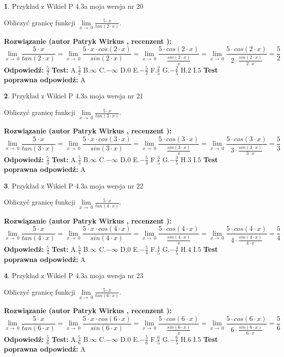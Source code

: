 \documentclass[12pt, a4paper]{article}
\theoremstyle{definition} %
\newtheorem{zad}{}
\newcommand{\zadStart}[1]{\begin{zad}#1\newline}
\newcommand{\zadStop}{\end{zad}}
\newcommand{\rozwStart}[2]{\noindent \textbf{Rozwiązanie (autor #1 , recenzent #2): }\newline}
\newcommand{\rozwStop}{\newline}
\newcommand{\odpStart}{\noindent \textbf{Odpowiedź:}\newline}
\newcommand{\odpStop}{\newline}
\newcommand{\testStart}{\noindent \textbf{Test:}\newline}
\newcommand{\testStop}{\newline}
\newcommand{\kluczStart}{\noindent \textbf{Test poprawna odpowiedź:}\newline}
\newcommand{\kluczStop}{\newline}
\begin{document}
\zadStart{Przykład z Wikieł P 4.3a moja wersja nr 20}


Obliczyć granicę funkcji $\lim\limits_{x\to\ 0}\frac{5 \cdot x}{tan(2 \cdot x)}$.
\zadStop
\rozwStart{Patryk Wirkus}{}
$$\lim\limits_{x\to\ 0}\frac{5 \cdot x}{tan(2 \cdot x)}=\lim\limits_{x\to\ 0}\frac{5 \cdot x \cdot cos(2 \cdot x)}{sin(2 \cdot x)}=\lim\limits_{x\to\ 0}\frac{5 \cdot cos(2 \cdot x)}{\frac{sin(2 \cdot x)}{x}}=\lim\limits_{x\to\ 0}\frac{5 \cdot cos(2 \cdot x)}{2 \cdot \frac{sin(2 \cdot x)}{2 \cdot x}} = \frac{5}{2}$$
\rozwStop
\odpStart
$\frac{5}{2}$
\odpStop
\testStart
A.$\frac{5}{2}$
B.$\infty$
C.$-\infty$
D.$0$
E.$-\frac{5}{2}$
F.$\frac{2}{5}$
G.$-\frac{2}{5}$
H.$2$
I.$5$
\testStop
\kluczStart
A
\kluczStop



\zadStart{Przykład z Wikieł P 4.3a moja wersja nr 21}


Obliczyć granicę funkcji $\lim\limits_{x\to\ 0}\frac{5 \cdot x}{tan(3 \cdot x)}$.
\zadStop
\rozwStart{Patryk Wirkus}{}
$$\lim\limits_{x\to\ 0}\frac{5 \cdot x}{tan(3 \cdot x)}=\lim\limits_{x\to\ 0}\frac{5 \cdot x \cdot cos(3 \cdot x)}{sin(3 \cdot x)}=\lim\limits_{x\to\ 0}\frac{5 \cdot cos(3 \cdot x)}{\frac{sin(3 \cdot x)}{x}}=\lim\limits_{x\to\ 0}\frac{5 \cdot cos(3 \cdot x)}{3 \cdot \frac{sin(3 \cdot x)}{3 \cdot x}} = \frac{5}{3}$$
\rozwStop
\odpStart
$\frac{5}{3}$
\odpStop
\testStart
A.$\frac{5}{3}$
B.$\infty$
C.$-\infty$
D.$0$
E.$-\frac{5}{3}$
F.$\frac{3}{5}$
G.$-\frac{3}{5}$
H.$3$
I.$5$
\testStop
\kluczStart
A
\kluczStop



\zadStart{Przykład z Wikieł P 4.3a moja wersja nr 22}


Obliczyć granicę funkcji $\lim\limits_{x\to\ 0}\frac{5 \cdot x}{tan(4 \cdot x)}$.
\zadStop
\rozwStart{Patryk Wirkus}{}
$$\lim\limits_{x\to\ 0}\frac{5 \cdot x}{tan(4 \cdot x)}=\lim\limits_{x\to\ 0}\frac{5 \cdot x \cdot cos(4 \cdot x)}{sin(4 \cdot x)}=\lim\limits_{x\to\ 0}\frac{5 \cdot cos(4 \cdot x)}{\frac{sin(4 \cdot x)}{x}}=\lim\limits_{x\to\ 0}\frac{5 \cdot cos(4 \cdot x)}{4 \cdot \frac{sin(4 \cdot x)}{4 \cdot x}} = \frac{5}{4}$$
\rozwStop
\odpStart
$\frac{5}{4}$
\odpStop
\testStart
A.$\frac{5}{4}$
B.$\infty$
C.$-\infty$
D.$0$
E.$-\frac{5}{4}$
F.$\frac{4}{5}$
G.$-\frac{4}{5}$
H.$4$
I.$5$
\testStop
\kluczStart
A
\kluczStop



\zadStart{Przykład z Wikieł P 4.3a moja wersja nr 23}


Obliczyć granicę funkcji $\lim\limits_{x\to\ 0}\frac{5 \cdot x}{tan(6 \cdot x)}$.
\zadStop
\rozwStart{Patryk Wirkus}{}
$$\lim\limits_{x\to\ 0}\frac{5 \cdot x}{tan(6 \cdot x)}=\lim\limits_{x\to\ 0}\frac{5 \cdot x \cdot cos(6 \cdot x)}{sin(6 \cdot x)}=\lim\limits_{x\to\ 0}\frac{5 \cdot cos(6 \cdot x)}{\frac{sin(6 \cdot x)}{x}}=\lim\limits_{x\to\ 0}\frac{5 \cdot cos(6 \cdot x)}{6 \cdot \frac{sin(6 \cdot x)}{6 \cdot x}} = \frac{5}{6}$$
\rozwStop
\odpStart
$\frac{5}{6}$
\odpStop
\testStart
A.$\frac{5}{6}$
B.$\infty$
C.$-\infty$
D.$0$
E.$-\frac{5}{6}$
F.$\frac{6}{5}$
G.$-\frac{6}{5}$
H.$6$
I.$5$
\testStop
\kluczStart
A
\kluczStop
\end{document}
